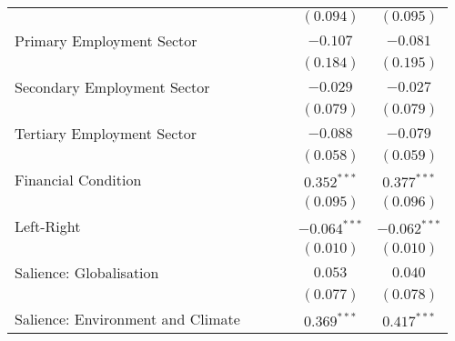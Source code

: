\begin{center}
\begin{tiny}
\begin{longtable}{l@{} c@{} c@{} c@{} c@{} c@{}}
                                                      &                  &                  &                  & $(0.094)$        & $(0.095)$        \\
\quad Primary Employment Sector                       &                  &                  &                  & $-0.107$         & $-0.081$         \\
                                                      &                  &                  &                  & $(0.184)$        & $(0.195)$        \\
\quad Secondary Employment Sector                     &                  &                  &                  & $-0.029$         & $-0.027$         \\
                                                      &                  &                  &                  & $(0.079)$        & $(0.079)$        \\
\quad Tertiary Employment Sector                      &                  &                  &                  & $-0.088$         & $-0.079$         \\
                                                      &                  &                  &                  & $(0.058)$        & $(0.059)$        \\
\quad Financial Condition                             &                  &                  &                  & $0.352^{***}$    & $0.377^{***}$    \\
                                                      &                  &                  &                  & $(0.095)$        & $(0.096)$        \\
\quad Left-Right                                      &                  &                  &                  & $-0.064^{***}$   & $-0.062^{***}$   \\
                                                      &                  &                  &                  & $(0.010)$        & $(0.010)$        \\
\quad Salience: Globalisation                         &                  &                  &                  & $0.053$          & $0.040$          \\
                                                      &                  &                  &                  & $(0.077)$        & $(0.078)$        \\
\quad Salience: Environment and Climate               &                  &                  &                  & $0.369^{***}$    & $0.417^{***}$    \\

\end{longtable}
\end{tiny}
\end{center}
